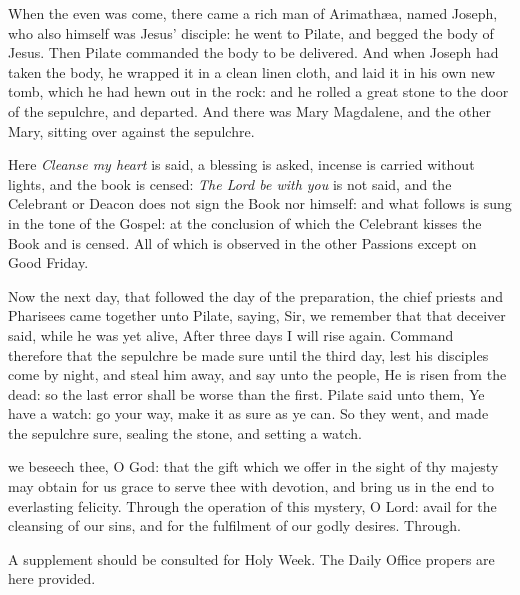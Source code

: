 When the even was come, there came a rich man of Arimath{\ae}a, named Joseph, who also himself was Jesus' disciple: he went to Pilate, and begged the body of Jesus. Then Pilate commanded the body to be delivered. And when Joseph had taken the body, he wrapped it in a clean linen cloth, and laid it in his own new tomb, which he had hewn out in the rock: and he rolled a great stone to the door of the sepulchre, and departed. And there was Mary Magdalene, and the other Mary, sitting over against the sepulchre.
\begin{rubric}
    Here \emph{Cleanse my heart} is said, a blessing is asked, incense is carried without lights, and the book is censed: \emph{The Lord be with you} is not said, and the Celebrant or Deacon does not sign the Book nor himself: and what follows is sung in the tone of the Gospel: at the conclusion of which the Celebrant kisses the Book and is censed. All of which is observed in the other Passions except on Good Friday.
\end{rubric}
Now the next day, that followed the day of the preparation, the chief priests and Pharisees came together unto Pilate, saying, Sir, we remember that that deceiver said, while he was yet alive, After three days I will rise again. Command therefore that the sepulchre be made sure until the third day, lest his disciples come by night, and steal him away, and say unto the people, He is risen from the dead: so the last error shall be worse than the first. Pilate said unto them, Ye have a watch: go your way, make it as sure as ye can. So they went, and made the sepulchre sure, sealing the stone, and setting a watch.

\secret
{} we beseech thee, O God: that the gift which we offer in the sight of thy majesty may obtain for us grace to serve thee with devotion, and bring us in the end to everlasting felicity. Through
\postcommunion
{} the operation of this mystery, O Lord: avail for the cleansing of our sins, and for the fulfilment of our godly desires. Through.

{}
\begin{rubric}
    A supplement %
    should be consulted for Holy Week. The Daily Office propers are here provided.
\end{rubric}
	\par\noindent

